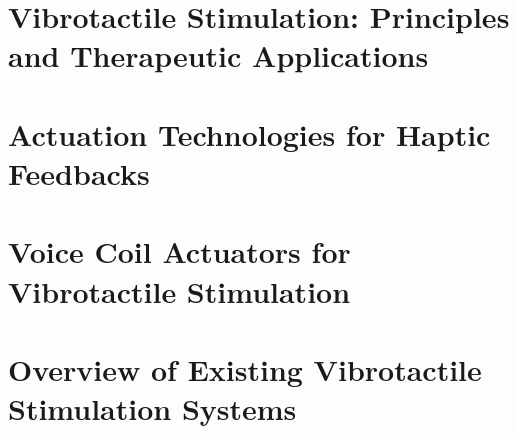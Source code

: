 \section{Vibrotactile Stimulation: Principles and Therapeutic Applications}
\cite{Campbell.2022}

\cite{ClementsCortes.2016, Heesterbeek.2019,Lam.2018, Clair.1993, Kim.2018, ClementsCortes.2017, Mercado.2006, ClementsCortes.2017b, ClementsCortes.2022}


\section{Actuation Technologies for Haptic Feedbacks}
\cite{KOIKE.2004}
\cite{}
\cite{}
\cite{}

\section{Voice Coil Actuators for Vibrotactile Stimulation}

\section{Overview of Existing Vibrotactile Stimulation Systems}




